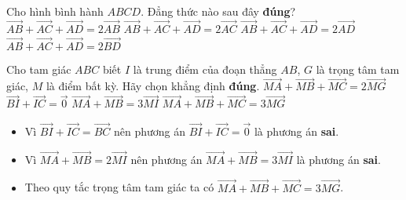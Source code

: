 \begin{ex}%
	Cho hình bình hành $ABCD$. Đẳng thức nào sau đây \textbf{đúng}?
	\choice
	{$\overrightarrow{AB}+\overrightarrow{AC}+\overrightarrow{AD}=2\overrightarrow{AB}$}
	{\True $\overrightarrow{AB}+\overrightarrow{AC}+\overrightarrow{AD}=2\overrightarrow{AC}$}
	{$\overrightarrow{AB}+\overrightarrow{AC}+\overrightarrow{AD}=2\overrightarrow{AD}$}
	{$\overrightarrow{AB}+\overrightarrow{AC}+\overrightarrow{AD}=2\overrightarrow{BD}$}
\end{ex}
\begin{ex}%
	Cho tam giác $ABC$ biết $I$ là trung điểm của đoạn thẳng $AB$, $G$ là trọng tâm tam giác, $M$ là điểm bất kỳ. Hãy chọn khẳng định \textbf{đúng}.
	\choice
	{$\overrightarrow{MA}+\overrightarrow{MB}+\overrightarrow{MC}=2\overrightarrow{MG}$}
	{$\overrightarrow{BI}+\overrightarrow{IC}=\overrightarrow{0}$}
	{$\overrightarrow{MA}+\overrightarrow{MB}=3\overrightarrow{MI}$}
	{\True $\overrightarrow{MA}+\overrightarrow{MB}+\overrightarrow{MC}=3\overrightarrow{MG}$}
	\loigiai
	{\begin{itemize}
			\item Vì $\overrightarrow{BI}+\overrightarrow{IC}=\overrightarrow{BC}$ nên phương án $\overrightarrow{BI}+\overrightarrow{IC}=\overrightarrow{0}$ là phương án \textbf{sai}.
			\item Vì $\overrightarrow{MA}+\overrightarrow{MB}=2\overrightarrow{MI}$ nên phương án $\overrightarrow{MA}+\overrightarrow{MB}=3\overrightarrow{MI}$ là phương án \textbf{sai}.
			\item Theo quy tắc trọng tâm tam giác ta có $ \overrightarrow{MA}+\overrightarrow{MB}+\overrightarrow{MC} = 3\overrightarrow{MG}$.
	\end{itemize} }
\end{ex}
